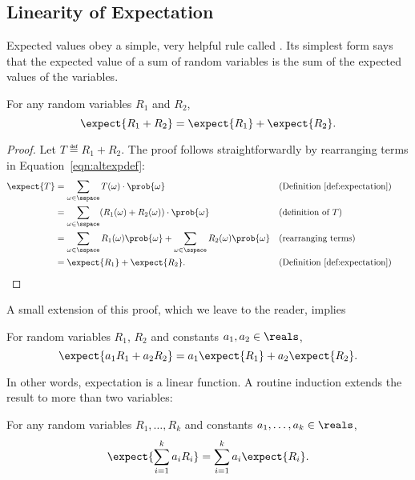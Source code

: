 \subsection{Linearity of Expectation}\label{finlin}

Expected values obey a simple, very helpful rule called
.  Its simplest form says that the
expected value of a sum of random variables is the sum of the expected
values of the variables.

\begin{theorem}\label{expsum-2}
For any random variables $R_1$ and $R_2$,
\[
\expect{R_1 + R_2} = \expect{R_1} + \expect{R_2}.
\]
\end{theorem}

\begin{proof}
Let $T \eqdef R_1+R_2$.  The proof follows straightforwardly by
rearranging terms in Equation~\eqref{eqn:altexpdef}:
\begin{align*}
\expect{T}
    & = \sum_{\omega \in \sspace} T(\omega) \cdot \prob{\omega}
        && \text{(Definition~\ref{def:expectation})}\\
        & = \sum_{\omega \in \sspace} (R_1(\omega) + R_2(\omega)) \cdot \prob{\omega}
        && \text{(definition of $T$)}\\
        & = \sum_{\omega \in \sspace} R_1(\omega) \prob{\omega} +
              \sum_{\omega \in \sspace} R_2(\omega) \prob{\omega}
        && \text{(rearranging terms)}\\
        & = \expect{R_1} + \expect{R_2}.   
        && \text{(Definition~\ref{def:expectation})} && \qedhere
\end{align*}
\end{proof}

A small extension of this proof, which we leave to the reader, implies
\begin{theorem}
For random variables $R_1$, $R_2$ and constants $a_1,a_2 \in \reals$,
\[
\expect{a_1R_1 + a_2R_2} = a_1\expect{R_1} + a_2\expect{R_2}.
\]
\end{theorem}
In other words, expectation is a linear function.  A routine induction
extends the result to more than two variables:
\begin{corollary}\label{linexp-k-thm}
For any random variables $R_1, \dots, R_k$ and constants $a_1, \dots, a_k
\in \reals$,
\[
    \expect{\sum_{i=1}^k a_iR_i} = \sum_{i=1}^k a_i\expect{R_i}.
\]
\end{corollary}

